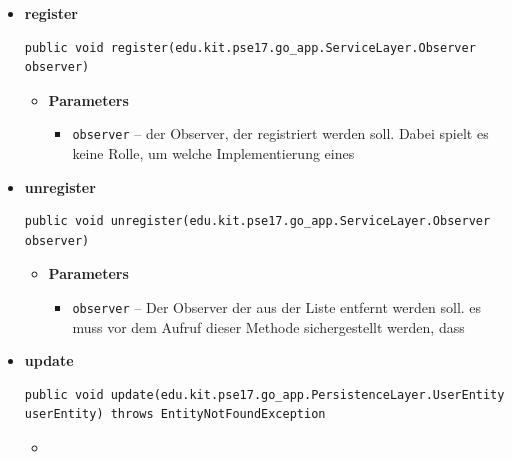 \documentclass[11pt,a4paper]{article}
\begin{document}
{{{{{{{{{{{{{{\begin{itemize}
{\begin{itemize}
\end{itemize}
}%
\item{ 
\hypertarget{edu.kit.pse17.go_app.PersistenceLayer.daos.UserDaoImp.register(edu.kit.pse17.go_app.ServiceLayer.Observer)}{{\bf  register}\\}
\begin{lstlisting}[frame=none]
public void register(edu.kit.pse17.go_app.ServiceLayer.Observer observer)\end{lstlisting} %
\begin{itemize}
\item{
{\bf  Parameters}
  \begin{itemize}
   \item{
\texttt{observer} -- der Observer, der registriert werden soll. Dabei spielt es keine Rolle, um welche Implementierung eines}
  \end{itemize}
}%
\end{itemize}
}%
\item{ 
\hypertarget{edu.kit.pse17.go_app.PersistenceLayer.daos.UserDaoImp.unregister(edu.kit.pse17.go_app.ServiceLayer.Observer)}{{\bf  unregister}\\}
\begin{lstlisting}[frame=none]
public void unregister(edu.kit.pse17.go_app.ServiceLayer.Observer observer)\end{lstlisting} %
\begin{itemize}
\item{
{\bf  Parameters}
  \begin{itemize}
   \item{
\texttt{observer} -- Der Observer der aus der Liste entfernt werden soll. es muss vor dem Aufruf dieser Methode sichergestellt werden, dass}
  \end{itemize}
}%
\end{itemize}
}%
\item{ 
\hypertarget{edu.kit.pse17.go_app.PersistenceLayer.daos.UserDaoImp.update(edu.kit.pse17.go_app.PersistenceLayer.UserEntity)}{{\bf  update}\\}
\begin{lstlisting}[frame=none]
public void update(edu.kit.pse17.go_app.PersistenceLayer.UserEntity userEntity) throws EntityNotFoundException\end{lstlisting} %
\begin{itemize}
\item{
}
\end{itemize}}
\end{itemize}}}}}}}}}}}}}}}
\end{document}
